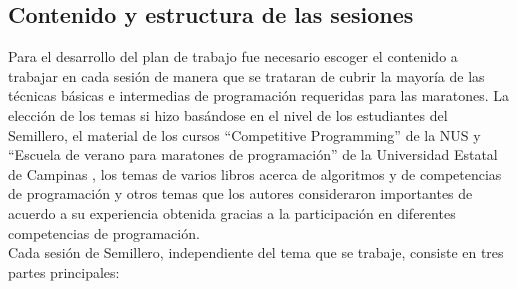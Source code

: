 \documentclass[conference]{IEEEtran}
\begin{document}
	\subsection{Contenido y estructura de las sesiones}
	Para el desarrollo del plan de trabajo fue necesario escoger el contenido a trabajar en cada sesión de manera que se trataran de cubrir la mayoría de las técnicas básicas e intermedias de programación requeridas para las maratones. La elección de los temas si hizo basándose en el nivel de los estudiantes del Semillero, el material de los cursos ``Competitive Programming'' de la NUS \cite{CourseNUS} y ``Escuela de verano para maratones de programación'' de la Universidad Estatal de Campinas \cite{Brasil}, los temas de varios libros acerca de algoritmos y de competencias de programación \cite{Cormen, ProgrammingChallenges, Halim, Halim2, ArtOfProgramming} y otros temas que los autores consideraron importantes de acuerdo a su experiencia obtenida gracias a la participación en diferentes competencias de programación.\\
	Cada sesión de Semillero, independiente del tema que se trabaje, consiste en tres partes principales: 
\end{document}
